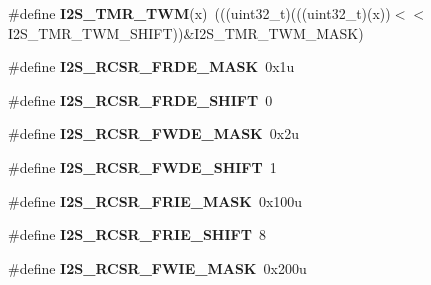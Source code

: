 \begin{DoxyCompactItemize}
\item 
\#define {\bfseries I2\+S\+\_\+\+T\+M\+R\+\_\+\+T\+WM}(x)~(((uint32\+\_\+t)(((uint32\+\_\+t)(x))$<$$<$I2\+S\+\_\+\+T\+M\+R\+\_\+\+T\+W\+M\+\_\+\+S\+H\+I\+FT))\&I2\+S\+\_\+\+T\+M\+R\+\_\+\+T\+W\+M\+\_\+\+M\+A\+SK)\hypertarget{group__I2S__Register__Masks_gad68d207aaa25383b7b3b2dd23c2a6d13}{}\label{group__I2S__Register__Masks_gad68d207aaa25383b7b3b2dd23c2a6d13}

\item 
\#define {\bfseries I2\+S\+\_\+\+R\+C\+S\+R\+\_\+\+F\+R\+D\+E\+\_\+\+M\+A\+SK}~0x1u\hypertarget{group__I2S__Register__Masks_gaf82cfc347ee6a04baec92ebf5198b06c}{}\label{group__I2S__Register__Masks_gaf82cfc347ee6a04baec92ebf5198b06c}

\item 
\#define {\bfseries I2\+S\+\_\+\+R\+C\+S\+R\+\_\+\+F\+R\+D\+E\+\_\+\+S\+H\+I\+FT}~0\hypertarget{group__I2S__Register__Masks_ga989180bd00d082c32921f39944f70c01}{}\label{group__I2S__Register__Masks_ga989180bd00d082c32921f39944f70c01}

\item 
\#define {\bfseries I2\+S\+\_\+\+R\+C\+S\+R\+\_\+\+F\+W\+D\+E\+\_\+\+M\+A\+SK}~0x2u\hypertarget{group__I2S__Register__Masks_gaba9d1c2766ec4f47df5ea6316e050cd0}{}\label{group__I2S__Register__Masks_gaba9d1c2766ec4f47df5ea6316e050cd0}

\item 
\#define {\bfseries I2\+S\+\_\+\+R\+C\+S\+R\+\_\+\+F\+W\+D\+E\+\_\+\+S\+H\+I\+FT}~1\hypertarget{group__I2S__Register__Masks_gac9c4253d0b73811583bb620a5f61f1ad}{}\label{group__I2S__Register__Masks_gac9c4253d0b73811583bb620a5f61f1ad}

\item 
\#define {\bfseries I2\+S\+\_\+\+R\+C\+S\+R\+\_\+\+F\+R\+I\+E\+\_\+\+M\+A\+SK}~0x100u\hypertarget{group__I2S__Register__Masks_ga97cd414600a5d5077af214ef0c166dc0}{}\label{group__I2S__Register__Masks_ga97cd414600a5d5077af214ef0c166dc0}

\item 
\#define {\bfseries I2\+S\+\_\+\+R\+C\+S\+R\+\_\+\+F\+R\+I\+E\+\_\+\+S\+H\+I\+FT}~8\hypertarget{group__I2S__Register__Masks_ga4f7d0729441e65e811ddbcf701db7692}{}\label{group__I2S__Register__Masks_ga4f7d0729441e65e811ddbcf701db7692}

\item 
\#define {\bfseries I2\+S\+\_\+\+R\+C\+S\+R\+\_\+\+F\+W\+I\+E\+\_\+\+M\+A\+SK}~0x200u\hypertarget{group__I2S__Register__Masks_ga220d8d29a1d3adbf9b2e25b2a0e43fa7}{}\label{group__I2S__Register__Masks_ga220d8d29a1d3adbf9b2e25b2a0e43fa7}


\end{DoxyCompactItemize}
